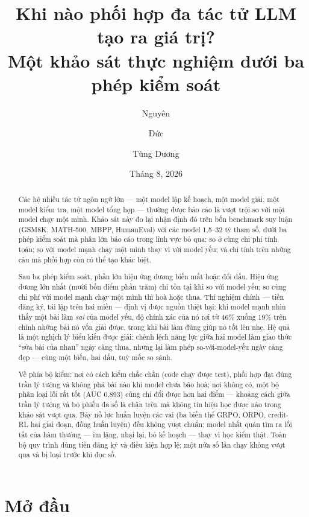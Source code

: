 \documentclass[12pt,a4paper]{article}
\title{\bfseries Khi nào phối hợp đa tác tử LLM tạo ra giá trị?\\
\large Một khảo sát thực nghiệm dưới ba phép kiểm soát}
\author{Nguyên \and Đức \and Tùng Dương}
\date{Tháng 8, 2026}
\begin{document}
\maketitle

\begin{abstract}
Các hệ nhiều tác tử ngôn ngữ lớn --- một model lập kế hoạch, một model giải, một model kiểm tra,
một model tổng hợp --- thường được báo cáo là vượt trội so với một model chạy một mình. Khảo sát
này đo lại nhận định đó trên bốn benchmark suy luận (GSM8K, MATH-500, MBPP, HumanEval) với các
model 1,5--32 tỷ tham số, dưới ba phép kiểm soát mà phần lớn báo cáo trong lĩnh vực bỏ qua:
so ở cùng chi phí tính toán; so với model mạnh chạy một mình thay vì với model yếu; và chỉ tính
trên những câu mà phối hợp còn có thể tạo khác biệt.

Sau ba phép kiểm soát, phần lớn hiệu ứng dương biến mất hoặc đổi dấu. Hiệu ứng dương lớn nhất
(mười bốn điểm phần trăm) chỉ tồn tại khi so với model yếu; so cùng chi phí với model mạnh chạy
một mình thì hoà hoặc thua. Thí nghiệm chính --- tiền đăng ký, tái lập trên hai miền --- định vị
được nguồn thiệt hại: khi model mạnh nhìn thấy một bài làm \emph{sai} của model yếu, độ chính
xác của nó rơi từ 46\% xuống 19\% trên chính những bài nó vốn giải được, trong khi bài làm đúng
giúp nó tốt lên nhẹ. Hệ quả là một nghịch lý biểu kiến được giải: chênh lệch năng lực giữa hai
model làm giao thức ``sửa bài của nhau'' ngày càng thua, nhưng lại làm phép so-với-model-yếu
ngày càng đẹp --- cùng một biến, hai dấu, tuỳ mốc so sánh.

Về phía bộ kiểm: nơi có cách kiểm chắc chắn (code chạy được test), phối hợp đạt đúng trần lý
tưởng và không phá bài nào khi model chưa bão hoà; nơi không có, một bộ phân loại lỗi rất tốt
(AUC 0,893) cũng chỉ đổi được hơn hai điểm --- khoảng cách giữa trần lý tưởng và bỏ phiếu đa số
là chặn trên mà không tín hiệu học được nào trong khảo sát vượt qua. Bảy nỗ lực huấn luyện
các vai (ba biến thể GRPO, ORPO, credit-RL hai giai đoạn, đồng huấn luyện) đều không vượt
chuẩn: model nhất quán tìm ra lối tắt của hàm thưởng --- im lặng, nhại lại, bỏ kế hoạch ---
thay vì học kiểm thật. Toàn bộ quy trình dùng
tiền đăng ký và điều kiện hợp lệ; một nửa số lần chạy không vượt qua và bị loại trước khi đọc số.
\end{abstract}

\section{Mở đầu}\label{sec:intro}
\end{document}
